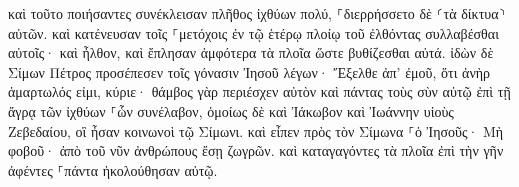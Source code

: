 \documentclass{openreader}
\begin{document}
καὶ τοῦτο ποιήσαντες συνέκλεισαν πλῆθος ἰχθύων πολύ, ⸀διερρήσσετο δὲ ⸂τὰ δίκτυα⸃ αὐτῶν. 
καὶ κατένευσαν τοῖς ⸀μετόχοις ἐν τῷ ἑτέρῳ πλοίῳ τοῦ ἐλθόντας συλλαβέσθαι αὐτοῖς· καὶ ἦλθον, καὶ ἔπλησαν ἀμφότερα τὰ πλοῖα ὥστε βυθίζεσθαι αὐτά. 
ἰδὼν δὲ Σίμων Πέτρος προσέπεσεν τοῖς γόνασιν Ἰησοῦ λέγων· Ἔξελθε ἀπ’ ἐμοῦ, ὅτι ἀνὴρ ἁμαρτωλός εἰμι, κύριε· 
θάμβος γὰρ περιέσχεν αὐτὸν καὶ πάντας τοὺς σὺν αὐτῷ ἐπὶ τῇ ἄγρᾳ τῶν ἰχθύων ⸀ὧν συνέλαβον, 
ὁμοίως δὲ καὶ Ἰάκωβον καὶ Ἰωάννην υἱοὺς Ζεβεδαίου, οἳ ἦσαν κοινωνοὶ τῷ Σίμωνι. καὶ εἶπεν πρὸς τὸν Σίμωνα ⸀ὁ Ἰησοῦς· Μὴ φοβοῦ· ἀπὸ τοῦ νῦν ἀνθρώπους ἔσῃ ζωγρῶν. 
καὶ καταγαγόντες τὰ πλοῖα ἐπὶ τὴν γῆν ἀφέντες ⸀πάντα ἠκολούθησαν αὐτῷ. 
\end{document}
